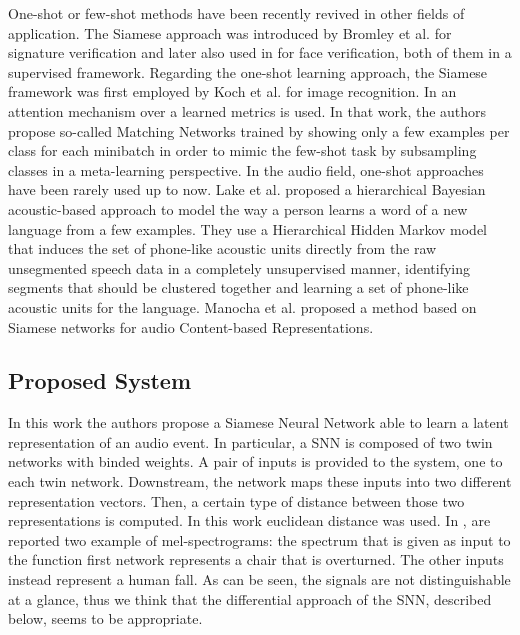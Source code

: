 One-shot or few-shot methods have been recently revived in other fields of application.
The Siamese approach was introduced by Bromley et al. \cite{bromley1994signature} for signature verification and later also used in \cite{chopra2005learning} for face verification, both of them in a supervised framework. Regarding the one-shot learning approach, the Siamese framework was first employed by Koch et al.\cite{koch2015siamese} for image recognition.
In \cite{vinyals2016matching} an attention mechanism over a learned metrics is used. In that work, the authors propose so-called Matching Networks trained by showing only a few examples per class for each minibatch in order to mimic the few-shot task by subsampling classes in a meta-learning perspective.
In the audio field, one-shot approaches have been rarely used up to now.
Lake et al. \cite{lake2014one} proposed a hierarchical Bayesian acoustic-based approach to model the way a person learns a word of a new language from a few examples. They use a Hierarchical Hidden Markov model that induces the set of phone-like acoustic units directly from the raw unsegmented speech data in a completely unsupervised manner, identifying segments that should be clustered together and learning a set of phone-like acoustic units for the language.
Manocha et al.\cite{manocha2017content} proposed a method based on Siamese networks for audio Content-based Representations.

\subsection{Proposed System}
\label{sec:proposed_app}
In this work the authors propose a Siamese Neural Network able to learn a latent representation of an audio event. In particular, a SNN is composed of two twin networks with binded weights. A pair of inputs is provided to the system, one to each twin network. Downstream, the network maps these inputs into two different representation vectors. Then, a certain type of distance between those two representations is computed. In this work euclidean distance was used. In , are reported two example of mel-spectrograms: the spectrum that is given as input to the function first network represents a chair that is overturned. The other inputs instead represent a human fall. As can be seen, the signals are not distinguishable at a glance, thus we think that the differential approach of the SNN, described below, seems to be appropriate.

